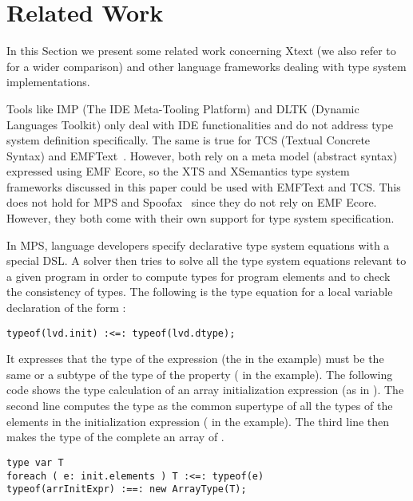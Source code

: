 \section{Related Work}
\label{sec:related}

In this Section we present some related work
concerning Xtext (we also refer to \cite{PP08} for a wider comparison)
and other language frameworks dealing with type system implementations.

\newcommand{\xtypes}{XTypeS}
\newcommand{\xtext}{Xtext}

Tools like IMP (The IDE Meta-Tooling Platform) \cite{imp09} and DLTK (Dynamic
Languages Toolkit) \cite{DLTK} only deal with IDE functionalities and do not
address type system definition specifically. 
The same is true for TCS (Textual Concrete Syntax) \cite{tcs}  
and EMFText~\cite{emftext09}. However, both rely on a meta model (abstract
syntax) expressed using EMF Ecore, so the XTS and XSemantics type system
frameworks discussed in this paper could be used with EMFText and TCS. 
This does not hold for MPS \cite{MPS} and Spoofax~\cite{Spoofax2010}
since they do not rely on EMF Ecore. However, they both come with their own
support for type system specification.

In MPS, language developers specify declarative type system equations with a
special DSL. A solver then tries to solve all the type system equations relevant
to a given program in order to compute types for program elements and to check
the consistency of types. The following is the type equation for a local
variable declaration of the form :

\begin{lstlisting}[language=MPS]
typeof(lvd.init) :<=: typeof(lvd.dtype);
\end{lstlisting}

\noindent
It expresses that the type of the  expression (the  in the
example) must be the same or a subtype of the type of the  property
( in the example). The following code shows the type calculation of an
array initialization expression (as in ). The second line
computes the type  as the common supertype of all the types of the
elements in the initialization expression ( in the example). The third
line then makes the type of the complete  an array of .

\begin{lstlisting}[language=MPS]
type var T
foreach ( e: init.elements ) T :<=: typeof(e)
typeof(arrInitExpr) :==: new ArrayType(T);
\end{lstlisting}

